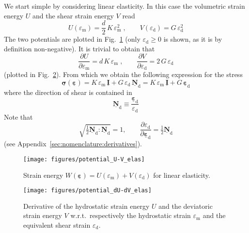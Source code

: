 \documentclass[times,namecite]{goose-article}
\newcommand\T[1]{\underline{\bm{{#1}}}}
\begin{document}
We start simple by considering linear elasticity. In this case the volumetric strain energy $U$ and the shear strain energy $V$ read
\begin{equation}
    \label{eq:W:elas}
    U ( \varepsilon_\mathrm{m}  ) = \frac{d}{2} \, K \, \varepsilon_\mathrm{m}^2
    \;, \qquad
    V ( \varepsilon_\mathrm{d} ) = G \, \varepsilon_\mathrm{d}^2
\end{equation}
The two potentials are plotted in Fig.~\ref{fig:U-V:elas} (only $\varepsilon_\mathrm{d} \geq 0$ is shown, as it is by definition non-negative). It is trivial to obtain that
\begin{equation}
    \frac{\partial U}{\partial \varepsilon_\mathrm{m}}
    =
    d \, K \, \varepsilon_\mathrm{m}
    \;, \qquad
    \frac{\partial V}{\partial \varepsilon_\mathrm{d}}
    =
    2 \, G \, \varepsilon_\mathrm{d}
\end{equation}
(plotted in Fig.~\ref{fig:dU-dV:elas}). From which we obtain the following expression for the stress
\begin{equation}
    \label{eq:sig-elas}
    \T{\sigma} ( \T{\varepsilon} )
    =
    K \, \varepsilon_\mathrm{m} \, \T{I}
    +
    G \, \varepsilon_\mathrm{d} \, \T{N}_\mathrm{d}
    =
    K \, \varepsilon_\mathrm{m} \, \T{I}
    +
    G \, \T{\varepsilon}_\mathrm{d}
\end{equation}
where the direction of shear is contained in
\begin{equation}
    \T{N}_\mathrm{d} \equiv \frac{\T{\varepsilon}_\mathrm{d}}{\varepsilon_\mathrm{d}}
\end{equation}
Note that
\begin{equation}
    \sqrt{ \tfrac{1}{2} \T{N}_\mathrm{d} : \T{N}_\mathrm{d} } = 1,
    \qquad
    \frac{\partial \varepsilon_\mathrm{d}}{\partial \T{\varepsilon}_\mathrm{d}} = \tfrac{1}{2} \T{N}_\mathrm{d}
\end{equation}
(see Appendix~\ref{sec:nomenclature:derivatives}).

\begin{figure}[htp]
    \centering
    \texttt{[image: figures/potential\_U-V\_elas]}
    \caption{Strain energy $W ( \T{\varepsilon} ) = U ( \varepsilon_\mathrm{m} ) + V ( \varepsilon_\mathrm{d} )$ for linear elasticity.}
    \label{fig:U-V:elas}
\end{figure}

\begin{figure}[htp]
    \centering
    \texttt{[image: figures/potential\_dU-dV\_elas]}
    \caption{Derivative of the hydrostatic strain energy $U$ and the deviatoric strain energy $V$ w.r.t.\ respectively the hydrostatic strain $\varepsilon_\mathrm{m}$ and the equivalent shear strain $\varepsilon_\mathrm{d}$.}
    \label{fig:dU-dV:elas}
\end{figure}
\end{document}
